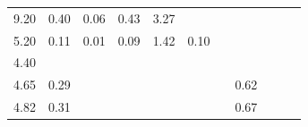 \begin{refsection}[referencesCh3]
\begin{table}
\begin{adjustbox}{scale=0.8,center}
\begin{tabular}{@{}ccccccccccc@{}}
		9.20                                                         & 0.40                                                & 0.06                                                & 0.43                                                & 3.27                                                &                                                      &                                                     &                                                       &                                                         &                                                      & \cite{Moller2}        \\
		5.20                                                         & 0.11                                                & 0.01                                                & 0.09                                                & 1.42                                                & 0.10                                                 &                                                     &                                                       &                                                         &                                                      & \cite{Walsh}         \\
		4.40                                                         &                                                     &                                                     &                                                     &                                                     &                                                      &                                                     &                                                       &                                                         &                                                      & \cite{Zheng}                                 \\
		4.65                                                         & 0.29                                                &                                                     &                                                     &                                                     &                                                      &                                                     & 0.62                                                  &                                                         &                                                      & \cite{Sorensen}                                           \\
		4.82                                                         & 0.31                                                &                                                     &                                                     &                                                     &                                                      &                                                     & 0.67                                                  &                                                         &                                                      & \cite{Sorensen}                                           \\

\end{tabular}
\end{adjustbox}
\end{table}
\end{refsection}
